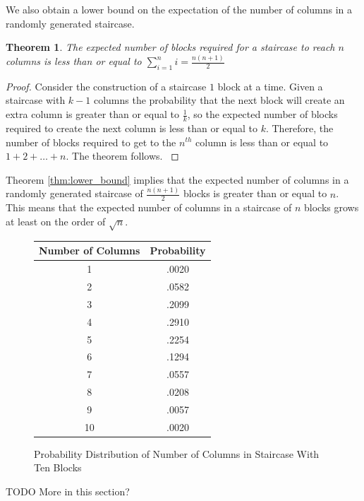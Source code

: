 \documentclass[12pt]{amsart}
\newtheorem{theorem}{Theorem}[section]
\begin{document}
We also obtain a lower bound on the expectation of the number of columns in a randomly generated staircase.

\begin{theorem}
\label{lower_bound}
The expected number of blocks required for a staircase to reach $n$ columns is less than or equal to $\displaystyle\sum_{i=1}^{n}i = \frac{n(n+1)}{2}$
\end{theorem}

\begin{proof}
Consider the construction of a staircase $1$ block at a time. Given a staircase with $k-1$ columns the probability that the next block will create an extra column is greater than or equal to $\frac{1}{k}$, so the expected number of blocks required to create the next column is less than or equal to $k$. Therefore, the number of blocks required to get to the $n^{th}$ column is less than or equal to $1 + 2 + \ldots + n$. The theorem follows.
\label{thm:lower_bound}
\end{proof}

Theorem \ref{thm:lower_bound} implies that the expected number of columns in a randomly generated staircase of $\frac{n(n+1)}{2}$ blocks is greater than or equal to $n$. This means that the expected number of columns in a staircase of $n$ blocks grows at least on the order of $\sqrt{n}$.





\begin{figure}
\caption{Probability Distribution of Number of Columns in Staircase With Ten Blocks}
\label{fig:prob_distribution}
\begin{center}
\begin{tabular}{| c | c |}
\hline
Number of Columns & Probability\\ \hline
1 & .0020\\ \hline
2 & .0582\\ \hline
3 & .2099\\ \hline
4 & .2910\\ \hline
5 & .2254\\ \hline
6 & .1294\\ \hline
7 & .0557\\ \hline
8 & .0208\\ \hline
9 & .0057\\ \hline
10 & .0020\\ \hline
\end{tabular}
\end{center}
\end{figure}
  





TODO More in this section?
\end{document}
